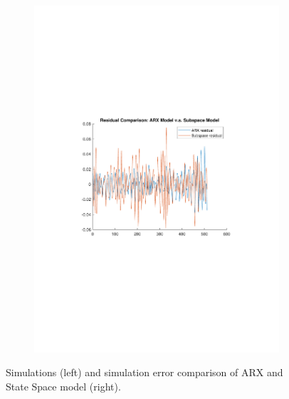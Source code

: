 \documentclass[]{article}
\begin{document}
\begin{figure}[ht]
\begin{subfigure}{.49\textwidth}
	\includegraphics[trim= 10cm 8cm 10cm 8cm, scale=0.4]{figures/sim_diff_arx_ss.pdf}
\end{subfigure}
\caption{Simulations (left) and simulation error comparison of ARX and State Space model (right).}
\label{fig:simulations}
\end{figure}
\end{document}
